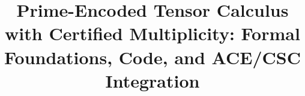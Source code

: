 \documentclass[11pt]{article}
\theoremstyle{plain}
\theoremstyle{definition}
\newcommand{\N}{\mathbb{N}}
\newcommand{\Z}{\mathbb{Z}}
\newcommand{\Q}{\mathbb{Q}}
\newcommand{\PP}{\mathbb{P}} %
\newcommand{\Sig}{\mathrm{Sig}}
\newcommand{\supp}{\mathrm{supp}}
\newcommand{\Hom}{\mathrm{Hom}}
\newcommand{\Ob}{\mathrm{Ob}}
\newcommand{\D}{\mathrm{Disc}} %
\newcommand{\M}{\mathbf{M}} %
\newcommand{\Mabs}{\lvert\mathbf{M}\rvert}
\newcommand{\one}{\mathbf{1}}
\newcommand{\xto}[1]{\xrightarrow{\;#1\;}}
\begin{document}
\usepackage[a4paper,margin=1in]{geometry}
\usepackage[T1]{fontenc}
\usepackage[utf8]{inputenc}
\usepackage{amsmath,amssymb,amsfonts,amsthm,mathtools}
\usepackage{microtype}
\usepackage{enumitem}
\usepackage{xcolor}
\usepackage{hyperref}
\usepackage[nameinlink,capitalise]{cleveref}
\usepackage{tikz}
\usepackage{listings}
\lstset{basicstyle=\ttfamily\small,breaklines=true,frame=single,columns=fullflexible}

\theoremstyle{plain}
\newtheorem{theorem}{Theorem}[section]
\newtheorem{proposition}[theorem]{Proposition}
\newtheorem{lemma}[theorem]{Lemma}
\newtheorem{corollary}[theorem]{Corollary}
\theoremstyle{definition}
\newtheorem{definition}[theorem]{Definition}
\newtheorem{example}[theorem]{Example}
\newtheorem{remark}[theorem]{Remark}

\newcommand{\N}{\mathbb{N}}
\newcommand{\Z}{\mathbb{Z}}
\newcommand{\Q}{\mathbb{Q}}
\newcommand{\QQx}{\mathbb{Q}^{\times}}
\newcommand{\PP}{\mathbb{P}} %
\newcommand{\Sig}{\mathrm{Sig}}
\newcommand{\supp}{\mathrm{supp}}
\newcommand{\Hom}{\mathrm{Hom}}
\newcommand{\Ob}{\mathrm{Ob}}
\newcommand{\D}{\mathrm{Disc}} %
\newcommand{\M}{\mathbf{M}} %
\newcommand{\Mabs}{\lvert\mathbf{M}\rvert}
\newcommand{\one}{\mathbf{1}}
\newcommand{\xto}[1]{\xrightarrow{\;#1\;}}

\title{Prime-Encoded Tensor Calculus with Certified Multiplicity: Formal Foundations, Code, and ACE/CSC Integration}
\author{ }
\date{ }
\end{document}

